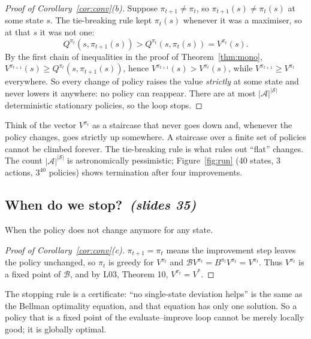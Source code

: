 \documentclass[11pt,a4paper]{article}
\newcommand{\Sset}{\mathcal{S}}
\newcommand{\Aset}{\mathcal{A}}
\newcommand{\B}{\mathcal{B}}
\newcommand{\sltag}[1]{\texorpdfstring{\ \emph{(slides #1)}}{ (slides #1)}}
\theoremstyle{plain}
\theoremstyle{definition}
\theoremstyle{remark}
\begin{document}
\begin{proof}[Proof of Corollary~\ref{cor:conv}(b)]
Suppose $\pi_{t+1}\ne\pi_t$, so $\pi_{t+1}(s)\ne\pi_t(s)$ at some state $s$. The tie-breaking rule kept $\pi_t(s)$ whenever it was a maximiser, so at that $s$ it was not one:
\[
Q^{\pi_t}(s,\pi_{t+1}(s))>Q^{\pi_t}(s,\pi_t(s))=V^{\pi_t}(s).
\]
By the first chain of inequalities in the proof of Theorem~\ref{thm:mono}, $V^{\pi_{t+1}}(s)\ge Q^{\pi_t}(s,\pi_{t+1}(s))$, hence $V^{\pi_{t+1}}(s)>V^{\pi_t}(s)$, while $V^{\pi_{t+1}}\ge V^{\pi_t}$ everywhere. So every change of policy raises the value \emph{strictly} at some state and never lowers it anywhere: no policy can reappear. There are at most $|\Aset|^{|\Sset|}$ deterministic stationary policies, so the loop stops.
\end{proof}

\begin{intuition}
Think of the vector $V^{\pi_t}$ as a staircase that never goes down and, whenever the policy changes, goes strictly up somewhere. A staircase over a finite set of policies cannot be climbed forever. The tie-breaking rule is what rules out ``flat'' changes. The count $|\Aset|^{|\Sset|}$ is astronomically pessimistic; Figure~\ref{fig:run} (40 states, 3 actions, $3^{40}$ policies) shows termination after four improvements.
\end{intuition}

\subsection{When do we stop?\sltag{35}}\label{sec:terminate}
When the policy does not change anymore for any state.

\begin{proof}[Proof of Corollary~\ref{cor:conv}(c)]
$\pi_{t+1}=\pi_t$ means the improvement step leaves the policy unchanged, so $\pi_t$ is greedy for $V^{\pi_t}$ and $\B V^{\pi_t}=B^{\pi_t}V^{\pi_t}=V^{\pi_t}$. Thus $V^{\pi_t}$ is a fixed point of $\B$, and by L03, Theorem 10, $V^{\pi_t}=V^*$.
\end{proof}

\begin{intuition}
The stopping rule is a certificate: ``no single-state deviation helps'' is the same as the Bellman optimality equation, and that equation has only one solution. So a policy that is a fixed point of the evaluate--improve loop cannot be merely locally good; it is globally optimal.
\end{intuition}
\end{document}
